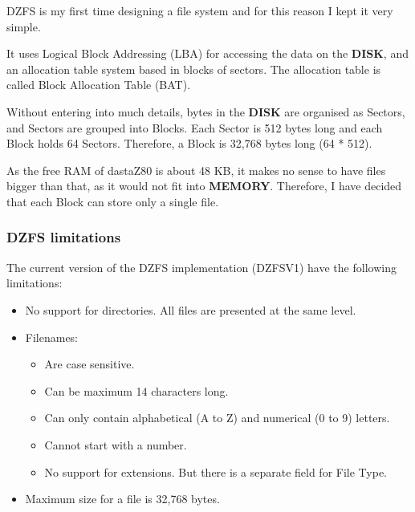     DZFS is my first time designing a file system and for this reason I kept it
    very simple.

    It uses Logical Block Addressing (LBA) for accessing the data on the
    \textbf{DISK}, and an allocation table system based in blocks of sectors.
    The allocation table is called Block Allocation Table (BAT).

    Without entering into much details, bytes in the \textbf{DISK} are organised
    as Sectors, and Sectors are grouped into Blocks. Each Sector is 512 bytes
    long and each Block holds 64 Sectors. Therefore, a Block is 32,768 bytes
    long (64 * 512).

    As the free RAM of dastaZ80 is about 48 KB, it makes no sense to have files
    bigger than that, as it would not fit into \textbf{MEMORY}. Therefore, I
    have decided that each Block can store only a single file.

        \subsubsection{DZFS limitations}
        The current version of the DZFS implementation (DZFSV1) have the following
        limitations:

        \begin{itemize}
            \item No support for directories. All files are presented at the same
            level.
            \item Filenames:
            \begin{itemize}
                \item Are case sensitive.
                \item Can be maximum 14 characters long.
                \item Can only contain alphabetical (A to Z) and numerical (0 to 9)
                letters.
                \item Cannot start with a number.
                \item No support for extensions. But there is a separate field for
                File Type.
            \end{itemize}
            \item Maximum size for a file is 32,768 bytes.
        \end{itemize}
        
